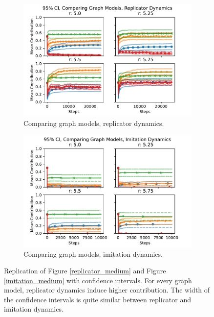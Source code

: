 \FloatBarrier 
\begin{figure}[!h]
  \begin{subfigure}[b]{0.45\textwidth}
    \includegraphics[width=1.1\textwidth]{images/Rep_gtype_med_CI.pdf}
    \caption{Comparing graph models, replicator dynamics.   }
    \label{rep_high_gtype_2}
  \end{subfigure}
  \hfill
  \begin{subfigure}[b]{0.45\textwidth}
    \includegraphics[width=1.1\textwidth]{images/ID_gtype_med_CI.pdf}
    \caption{Comparing graph models, imitation dynamics. }
    \label{ID_high_gtype_2}
  \end{subfigure}
  \caption{Replication of Figure  \ref{replicator_medium} and Figure \ref{imitation_medium} with confidence intervals. For every graph model, replicator dynamics induce higher contribution. The width of the confidence intervals is quite similar between replicator and imitation dynamics. } \label{comparing_rep_ID_high}
\end{figure} 
\FloatBarrier

